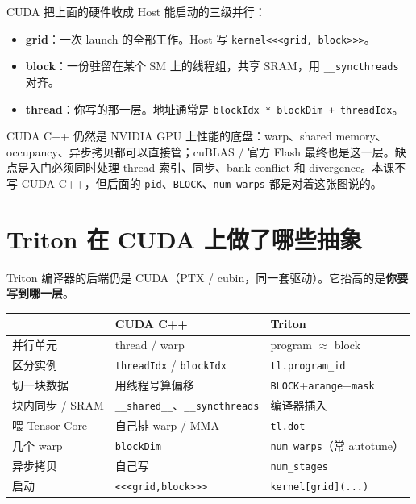 CUDA 把上面的硬件收成 Host 能启动的三级并行：

\figcudagrid

\begin{itemize}
  \item \textbf{grid}：一次 launch 的全部工作。Host 写 \texttt{kernel<<<grid, block>>>}。
  \item \textbf{block}：一份驻留在某个 SM 上的线程组，共享 SRAM，用 \texttt{\_\_syncthreads} 对齐。
  \item \textbf{thread}：你写的那一层。地址通常是 \texttt{blockIdx * blockDim + threadIdx}。
\end{itemize}

CUDA C++ 仍然是 NVIDIA GPU 上性能的底盘：warp、shared memory、occupancy、异步拷贝都可以直接管；cuBLAS / 官方 Flash 最终也是这一层。缺点是入门必须同时处理 thread 索引、同步、bank conflict 和 divergence。本课不写 CUDA C++，但后面的 \texttt{pid}、\texttt{BLOCK}、\texttt{num\_warps} 都是对着这张图说的。

\section{Triton 在 CUDA 上做了哪些抽象}

Triton 编译器的后端仍是 CUDA（PTX / cubin，同一套驱动）。它抬高的是\textbf{你要写到哪一层}。

\figtritonabs

\noindent\begin{minipage}{\linewidth}
\centering\small
{}
\begin{tabular}{lll}
  \toprule
  & CUDA C++ & Triton \\
  \midrule
  并行单元 & thread / warp & program $\approx$ block \\
  区分实例 & \texttt{threadIdx} / \texttt{blockIdx} & \texttt{tl.program\_id} \\
  切一块数据 & 用线程号算偏移 & \texttt{BLOCK}+\texttt{arange}+\texttt{mask} \\
  块内同步 / SRAM & \texttt{\_\_shared\_\_}、\texttt{\_\_syncthreads} & 编译器插入 \\
  喂 Tensor Core & 自己排 warp / MMA & \texttt{tl.dot} \\
  几个 warp & \texttt{blockDim} & \texttt{num\_warps}（常 autotune） \\
  异步拷贝 & 自己写 & \texttt{num\_stages} \\
  启动 & \texttt{<<<grid,block>>>} & \texttt{kernel[grid](...)} \\
  \bottomrule
\end{tabular}
\end{minipage}

